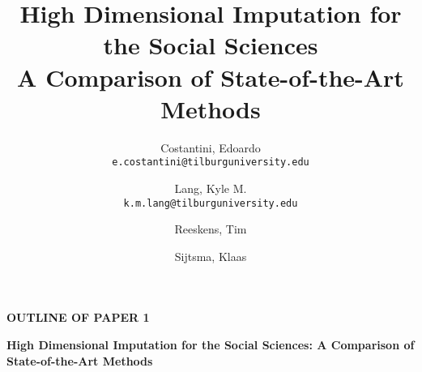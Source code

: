 \documentclass[11pt]{article}
\title{High Dimensional Imputation for the Social Sciences\\ \Large A Comparison of State-of-the-Art Methods}
\author{
  Costantini, Edoardo\\
  \small\texttt{e.costantini@tilburguniversity.edu}
  \and
  Lang, Kyle M.\\
  \small\texttt{k.m.lang@tilburguniversity.edu}
  \and  
  Reeskens, Tim \\
  \and  
  Sijtsma, Klaas\\
}
\newcommand{\pathBIB}{../../../statsLib}
\begin{document}

\begin{center}
\textbf{OUTLINE OF PAPER 1}

\textbf{High Dimensional Imputation for the Social Sciences: A Comparison of State-of-the-Art Methods}

\end{center}



\pagebreak

\maketitle



























\end{document}
